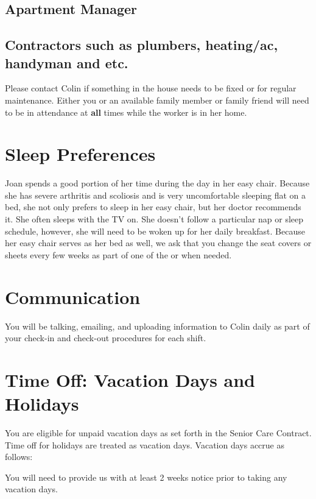 \documentclass[]{article}
\begin{document}
\subsection*{Apartment Manager}

\subsection*{Contractors such as plumbers, heating/ac, handyman and etc.}

Please contact Colin if something in the house needs to be fixed or for regular maintenance. Either you or an available family member or family friend will need to be in attendance at \textbf{all} times while the worker is in her home.

\section*{Sleep Preferences}

Joan spends a good portion of her time during the day in her easy chair.  Because she has severe arthritis and scoliosis and is very uncomfortable sleeping flat on a bed, she not only prefers to sleep in her easy chair, but her doctor recommends it. She often sleeps with the TV on. She doesn't follow a particular nap or sleep schedule, however, she will need to be woken up for her daily breakfast. Because her easy chair serves as her bed as well, we ask that you change the seat covers or sheets every few weeks as part of one of the \bigchores{} or when needed.

\section*{Communication}

You will be talking, emailing, and uploading information to Colin daily as part of your check-in and check-out procedures for each shift.

\section*{Time Off: Vacation Days and Holidays}

You are eligible for unpaid vacation days as set forth in the Senior Care Contract. Time off for holidays are treated as vacation days. Vacation days accrue as follows:

You will need to provide us with at least 2 weeks notice prior to taking any vacation days.
\end{document}
